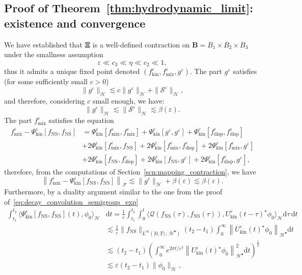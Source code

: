 \documentclass[10pt]{amsart}
\theoremstyle{definition}\newtheorem{defi}[theo]{Definition}\newtheorem{rema}[theo]{Remark}\newtheorem{exam}[theo]{Example}\newtheorem{exem}[theo]{Example}\newtheorem{nota}[theo]{Notation}
\newcommand{\ns}{\mathrm{NS}}
\newcommand{\mix}{\mathrm{mix}}
\newcommand{\kin}{\mathrm{kin}}
\renewcommand{\d}{\mathrm{d}}
\newcommand{\disp}{\mathrm{disp}}
\newcommand{\HH}{\mathcal{H}}
\newcommand{\QQ}{\mathcal{Q}}
\renewcommand{\SS}{\mathcal{S}}
\newcommand{\FFF}{\mathscr{F}}
\newcommand{\HHH}{\mathscr{H}}
\newcommand{\SSs}{\HH}
\newcommand{\SSsp}{\HH^{\bullet}}
\newcommand{\SSSs}{\HHH}
\newcommand{\SSSm}{\FFF}
\newcommand*\eps{{\varepsilon}}
\newcommand{\la}{\langle}
\newcommand{\ra}{\rangle}
\begin{document}
\subsection{Proof of Theorem~\ref{thm:hydrodynamic_limit}: existence and convergence}

We have established that $\bm{\Xi}$ is a well-defined contraction on $\bm{B}=B_1 \times B_2 \times B_3$ under the smallness assumption
\[
\eps \ll c_3 \ll \eta \ll c_2 \ll 1,
\]
thus it admits a unique fixed point denoted $(f^\eps_\kin, f^\eps_\mix, g^\eps)$. The part $g^\eps$ satisfies (for some sufficiently small $c > 0$)
\begin{equation*}
\| g^\eps \|_{\SSSs} \lesssim c \| g^\eps \|_{ \SSSs } + \| \SS^\eps \|_{ \SSSs },
\end{equation*}
and therefore, considering $c$ small enough, we have:
\begin{equation*}
\| g^\eps \|_{\SSSs} \lesssim \| \SS^\eps \|_{\SSSs} \lesssim \beta(\eps).
\end{equation*}
The part $f^\eps_\mix$ satisfies the equation
\begin{align*}
f^\eps_\mix - \Psi^\eps_\kin[f_\ns, f_\ns] &= \Psi^\eps_\kin\left[f^\eps_\mix, f^\eps_\mix\right] + \Psi^\eps_\kin\left[g^\eps, g^\eps\right] + \Psi^\eps_\kin\left[f^\eps_\disp, f^\eps_\disp\right] \\
& + 2 \Psi^\eps_\kin\left[f^\eps_\mix, f_\ns\right] + 2 \Psi^\eps_\kin\left[f^\eps_\mix, f_\disp^\eps\right] + 2 \Psi^\eps_\kin\left[f^\eps_\mix, g^\eps\right] \\
& + 2 \Psi^\eps_\kin\left[f_\ns, f^\eps_\disp\right] + 2 \Psi^\eps_\kin\left[f_\ns, g^\eps\right] + 2 \Psi^\eps_\kin\left[f^\eps_\disp, g^\eps\right],
\end{align*}
therefore, from the computations of Section~\ref{scn:mapping_contraction}, we have
\[
\left\| f^\eps_\mix - \Psi^\eps_\kin\left[f_\ns, f_\ns\right] \right\|_{ \SSSm } \lesssim \| g^\eps \|_{ \SSSs } + \beta(\eps) \lesssim \beta(\eps).
\]
Furthermore, by a duality argument similar to the one from the proof of~\eqref{eq:decay_convolution_semigroup_exp}
\begin{align*}
\int_{t_1}^{t_2} \big\la \Psi^\eps_\kin[f_\ns, f_\ns](t), \phi_0 \big\ra_{\SSs} &\d t = \frac{1}{\eps} \int_{t_1}^{t_2} \int_0^t \big\la \QQ\left(f_\ns(\tau), f_\ns(\tau) \right), U^\eps_\kin(t-\tau)^\star \phi_0 \big\ra_{\SSs} \d \tau \, \d t \\
& \lesssim \frac{1}{\eps} \| f_\ns \|_{ L^\infty\left([0, T)\,;\,\SSsp \right) } (t_2 - t_1) \int_0^\infty \left\| U^\eps_\kin(t)^\star \phi_0 \right\|_{ \SSsp } \d t \\
& \lesssim (t_2 - t_1) \left(\int_0^\infty e^{2 \sigma t / \eps^2} \left\| U^\eps_\kin(t)^\star \phi_0 \right\|_{ \SSsp }^2 \d t\right)^{\frac{1}{2}} \\
&\lesssim \eps (t_2 - t_1) \| \phi_0 \|_{\SSs},
\end{align*}
\end{document}

